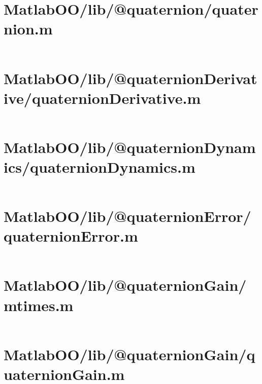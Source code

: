 \pagebreak
\section*{MatlabOO/lib/@quaternion/quaternion.m}\label{code:MatlabOO/lib/@quaternion/quaternion.m}
\inputminted[linenos,fontsize=\scriptsize]{matlab}{/home/dcouture/git/mathyourlife/TSatPy/beta_versions/matlab_object_oriented/lib/@quaternion/quaternion.m}

\pagebreak
\section*{MatlabOO/lib/@quaternionDerivative/quaternionDerivative.m}\label{code:MatlabOO/lib/@quaternionDerivative/quaternionDerivative.m}
\inputminted[linenos,fontsize=\scriptsize]{matlab}{/home/dcouture/git/mathyourlife/TSatPy/beta_versions/matlab_object_oriented/lib/@quaternionDerivative/quaternionDerivative.m}

\pagebreak
\section*{MatlabOO/lib/@quaternionDynamics/quaternionDynamics.m}\label{code:MatlabOO/lib/@quaternionDynamics/quaternionDynamics.m}
\inputminted[linenos,fontsize=\scriptsize]{matlab}{/home/dcouture/git/mathyourlife/TSatPy/beta_versions/matlab_object_oriented/lib/@quaternionDynamics/quaternionDynamics.m}

\pagebreak
\section*{MatlabOO/lib/@quaternionError/quaternionError.m}\label{code:MatlabOO/lib/@quaternionError/quaternionError.m}
\inputminted[linenos,fontsize=\scriptsize]{matlab}{/home/dcouture/git/mathyourlife/TSatPy/beta_versions/matlab_object_oriented/lib/@quaternionError/quaternionError.m}

\pagebreak
\section*{MatlabOO/lib/@quaternionGain/mtimes.m}\label{code:MatlabOO/lib/@quaternionGain/mtimes.m}
\inputminted[linenos,fontsize=\scriptsize]{matlab}{/home/dcouture/git/mathyourlife/TSatPy/beta_versions/matlab_object_oriented/lib/@quaternionGain/mtimes.m}

\pagebreak
\section*{MatlabOO/lib/@quaternionGain/quaternionGain.m}\label{code:MatlabOO/lib/@quaternionGain/quaternionGain.m}
\inputminted[linenos,fontsize=\scriptsize]{matlab}{/home/dcouture/git/mathyourlife/TSatPy/beta_versions/matlab_object_oriented/lib/@quaternionGain/quaternionGain.m}

